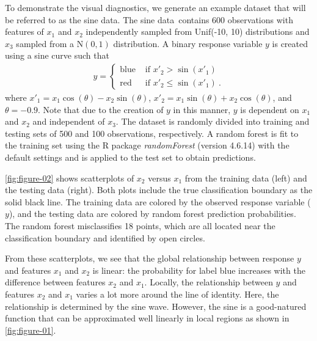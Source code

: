 \documentclass[AMS,STIX2COL]{WileyNJD-v2}\usepackage[]{graphicx}\usepackage[]{color}
\newcommand{\data}{sine data}
\renewcommand{\sout}[1]{\unskip}
\begin{document}
To demonstrate the visual diagnostics, we generate an example dataset that will be referred to as the \data. The \data \ contains 600 observations with  features of $x_1$ and $x_2$ independently sampled from Unif(-10, 10) distributions and $x_3$  sampled from a $\mbox{N}(0,1)$ distribution. A binary response variable $y$ is created using a  sine curve  such that
\begin{eqnarray}\label{eq:data}
  y=\begin{cases}
  \mbox{blue} & \mbox{ if } x'_2 > \sin\left(x'_1\right) \\
  \mbox{red} & \mbox{ if } x'_2 \le \sin\left(x'_1\right) \ .
  \end{cases}
\end{eqnarray}
where $x'_1=x_1\cos(\theta)-x_2\sin(\theta)$,  $x'_2=x_1\sin(\theta)+x_2\cos(\theta)$, and  $\theta=-0.9$. \sout{Then $y$ is defined as
\begin{eqnarray}\label{eq:data}
  y=\begin{cases}
  \mbox{blue} & \mbox{ if } x'_2 > \sin\left(x'_1\right) \\
  \mbox{red} & \mbox{ if } x'_2 \le \sin\left(x'_1\right) \ .
  \end{cases}
\end{eqnarray}}
Note that due to the creation of $y$ in this manner, $y$ is dependent on $x_1$ and $x_2$ and independent of $x_3$. The dataset is randomly divided into training and testing sets of 500 and 100 observations, respectively. A random forest is fit to the training set using the R package \emph{randomForest} (version 4.6.14) \citep{liaw:2002} with the default settings and is applied to the test set to obtain predictions. 

\autoref{fig:figure-02} shows scatterplots of $x_2$ versus $x_1$ from the training data (left) and the testing data (right). Both plots include the true classification boundary  as the solid black line. The training data are colored by the observed response variable ($y$), and the testing data are colored by random forest prediction probabilities. The random forest  misclassifies 18 points, which are all located near the classification boundary  and identified by open circles. 

From these scatterplots, we  see that the global relationship between response $y$ and features $x_1$ and $x_2$ is linear: the probability for label blue increases with the difference between features $x_2$ and $x_1$. Locally, the relationship between $y$ and features $x_2$ and $x_1$ varies a lot more around the line of identity. Here, the relationship is determined by the sine wave. However, the sine is a good-natured function that can be approximated well linearly in local regions as shown in \autoref{fig:figure-01}.
\end{document}
